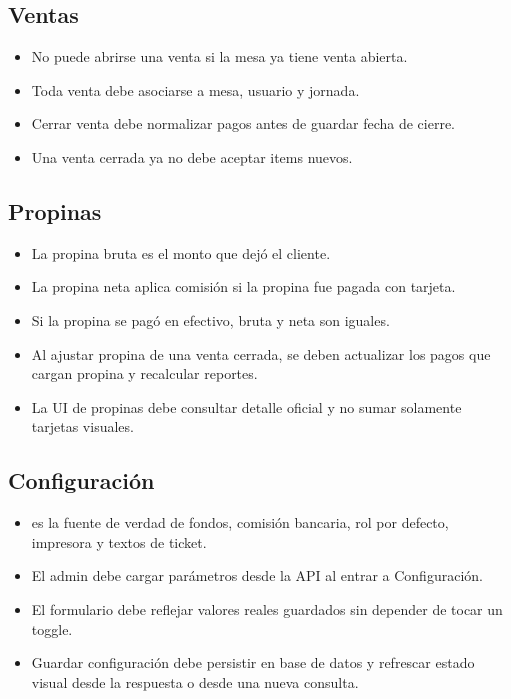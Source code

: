 \documentclass[11pt,letterpaper,openany]{report}
\newcommand{\code}[1]{\texttt{\detokenize{#1}}}
\begin{document}
\subsection{Ventas}

\begin{itemize}[leftmargin=*]
  \item No puede abrirse una venta si la mesa ya tiene venta abierta.
  \item Toda venta debe asociarse a mesa, usuario y jornada.
  \item Cerrar venta debe normalizar pagos antes de guardar fecha de cierre.
  \item Una venta cerrada ya no debe aceptar items nuevos.
\end{itemize}

\subsection{Propinas}

\begin{itemize}[leftmargin=*]
  \item La propina bruta es el monto que dejó el cliente.
  \item La propina neta aplica comisión si la propina fue pagada con tarjeta.
  \item Si la propina se pagó en efectivo, bruta y neta son iguales.
  \item Al ajustar propina de una venta cerrada, se deben actualizar los pagos que cargan propina y recalcular reportes.
  \item La UI de propinas debe consultar detalle oficial y no sumar solamente tarjetas visuales.
\end{itemize}

\subsection{Configuración}

\begin{itemize}[leftmargin=*]
  \item \code{ParametrosLocal} es la fuente de verdad de fondos, comisión bancaria, rol por defecto, impresora y textos de ticket.
  \item El admin debe cargar parámetros desde la API al entrar a Configuración.
  \item El formulario debe reflejar valores reales guardados sin depender de tocar un toggle.
  \item Guardar configuración debe persistir en base de datos y refrescar estado visual desde la respuesta o desde una nueva consulta.
\end{itemize}
\end{document}
